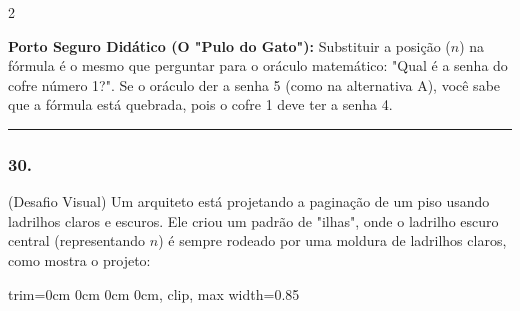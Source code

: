 \begin{multicols*}{2}
    \begin{boxexplicacao}
    \textbf{Porto Seguro Didático (O "Pulo do Gato"):} Substituir a posição ($n$) na fórmula é o mesmo que perguntar para o oráculo matemático: "Qual é a senha do cofre número 1?". Se o oráculo der a senha 5 (como na alternativa A), você sabe que a fórmula está quebrada, pois o cofre 1 deve ter a senha 4.
    \end{boxexplicacao}
\fi

\par\vspace{\espacoQuestao}

\noindent\textcolor{CorLinha}{\rule{\linewidth}{0.5pt}} 
\par\vspace{\espacoPreQuestao}
\subsubsection*{30.} 
\begin{enunciadoLiteral}
(Desafio Visual) Um arquiteto está projetando a paginação de um piso usando ladrilhos claros e escuros. Ele criou um padrão de "ilhas", onde o ladrilho escuro central (representando $n$) é sempre rodeado por uma moldura de ladrilhos claros, como mostra o projeto:

\begin{center}
\begin{adjustbox}{trim=0cm 0cm 0cm 0cm, clip, max width=0.85\linewidth}
\end{adjustbox}
\end{center}
\end{enunciadoLiteral}
\end{multicols*}
